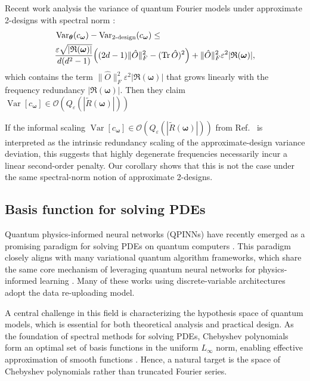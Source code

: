 \documentclass[%
 reprint,
 amsmath,amssymb,
 aps,
 pra,
]{revtex4-2}
\theoremstyle{definition}
\begin{document}
Recent work analysis the variance of quantum Fourier models under approximate 2-designs with spectral norm \cite[Theorem 7]{Hela2025}:
\begin{align}
&
\operatorname{Var}_{\bm{\theta}}(c_{\bm{\omega}})
-
\operatorname{Var}_{\text{2-design}}(c_{\bm{\omega}})
\leq \notag\\
&\frac{\varepsilon \sqrt{|\mathfrak{R}(\bm{\omega})|}}{d(d^2-1)} \Big( (2d-1)\|\hat{O}\|_F^2 - (\operatorname{Tr} \hat{O})^2 \Big) + \| \hat{O}\|_F^2 \varepsilon^2|\mathfrak{R}(\bm{\omega})|,
\end{align}
which contains the term $\| \hat{O}\|_F^2 \varepsilon^2|\mathfrak{R}(\bm{\omega})|$ that grows linearly with the frequency redundancy $|\mathfrak{R}(\bm{\omega})|$. Then they claim $\operatorname{Var}[c_{\bm{\omega}}]\in
\mathcal O(Q_\varepsilon(|\widetilde R(\bm{\omega})|))$


If the informal scaling \(\operatorname{Var}[c_{\bm{\omega}}]\in
\mathcal O(Q_\varepsilon(|\widetilde R(\bm{\omega})|))\) from
Ref.~\cite[Theorem~2]{Hela2025} is interpreted as the intrinsic redundancy
scaling of the approximate-design variance deviation, this suggests that highly
degenerate frequencies necessarily incur a linear second-order penalty. Our
corollary shows that this is not the case under the same spectral-norm notion of
approximate 2-designs.


\subsection{Basis function for solving PDEs}
\label{sec:basis_function}

Quantum physics-informed neural networks (QPINNs) have recently emerged as a promising paradigm for solving PDEs on quantum computers \cite{Berger2025,panichi2025,Farea2025,Setty2025,Chen2026,Lantigua2026,wang2026}. This paradigm closely aligns with many variational quantum algorithm frameworks, which share the same core mechanism of leveraging quantum neural networks for physics-informed learning \cite{Kyriienko_2021,Jaderberg_2024,Hunout_2025,Setty2025}. Many of these works using discrete-variable architectures \cite{Kyriienko_2021,Jaderberg_2024,Hunout_2025,Setty2025,Berger2025,Farea2025} adopt the data re-uploading model.

A central challenge in this field is characterizing the hypothesis space of quantum models, which is essential for both theoretical analysis and practical design. As the foundation of spectral methods for solving PDEs, Chebyshev polynomials form an optimal set of basis functions in the uniform \(L_\infty\) norm, enabling effective approximation of smooth functions \cite{Kyriienko_2021}. Hence, a natural target is the space of Chebyshev polynomials rather than truncated Fourier series.
\end{document}

